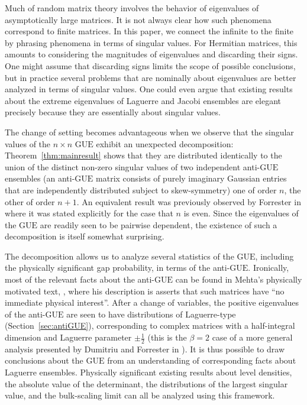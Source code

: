 \documentclass[pdftex, oneside, 10pt, letterpaper]{amsart}
\theoremstyle{plain}
\theoremstyle{definition}
\theoremstyle{remark}
\begin{document}
Much of random matrix theory involves the behavior of eigenvalues of
asymptotically large matrices.  It is not always clear how such
phenomena correspond to finite matrices.  In this paper, we connect
the infinite to the finite by phrasing phenomena in terms of singular
values.  For Hermitian matrices, this amounts to considering the
magnitudes of eigenvalues and discarding their signs.  One might
assume that discarding signs limits the scope of possible conclusions,
but in practice several problems that are nominally about eigenvalues
are better analyzed in terms of singular values.  One could even argue
that existing results about the extreme eigenvalues of Laguerre and
Jacobi ensembles are elegant precisely because they are essentially
about singular values.
  
The change of setting becomes advantageous when we observe that the
singular values of the $n\times n$ {\ensuremath{\mathrm{GUE}}}{} exhibit an unexpected
decomposition: Theorem~\ref{thm:mainresult} shows that they are
distributed identically to the union of the distinct non-zero singular
values of two independent anti-{\ensuremath{\mathrm{GUE}}}{} ensembles (an anti-{\ensuremath{\mathrm{GUE}}}{} matrix
consists of purely imaginary Gaussian entries that are independently
distributed subject to skew-symmetry) one of order $n$, the other of
order $n+1$.  An equivalent result was previously observed by
Forrester in \cite[Sec.~2.2]{Forrester-Evenness} where it was stated
explicitly for the case that $n$ is even.  Since the eigenvalues of
the {\ensuremath{\mathrm{GUE}}}{} are readily seen to be pairwise dependent, the existence of
such a decomposition is itself somewhat surprising.

The decomposition allows us to analyze several statistics of the
{\ensuremath{\mathrm{GUE}}}{}, including the physically significant gap probability, in terms
of the anti-{\ensuremath{\mathrm{GUE}}}{}.  Ironically, most of the relevant facts about the
anti-{\ensuremath{\mathrm{GUE}}}{} can be found in Mehta's physically motivated text,
\cite[Ch. 13]{Mehta}, where his description is asserts that such
matrices have ``no immediate physical interest''.  After a change of
variables, the positive eigenvalues of the anti-{\ensuremath{\mathrm{GUE}}}{} are seen to
have distributions of Laguerre-type (Section~\ref{sec:antiGUE}),
corresponding to complex matrices with a half-integral dimension and
Laguerre parameter $\pm\frac{1}{2}$ (this is the $\beta=2$ case of a
more general analysis presented by Dumitriu and Forrester in
\cite{DuFo}).  It is thus possible to draw conclusions about the
{\ensuremath{\mathrm{GUE}}}{} from an understanding of corresponding facts about Laguerre
ensembles.  Physically significant existing results about level
densities, the absolute value of the determinant, the distributions of
the largest singular value, and the bulk-scaling limit can all be
analyzed using this framework.
\end{document}
